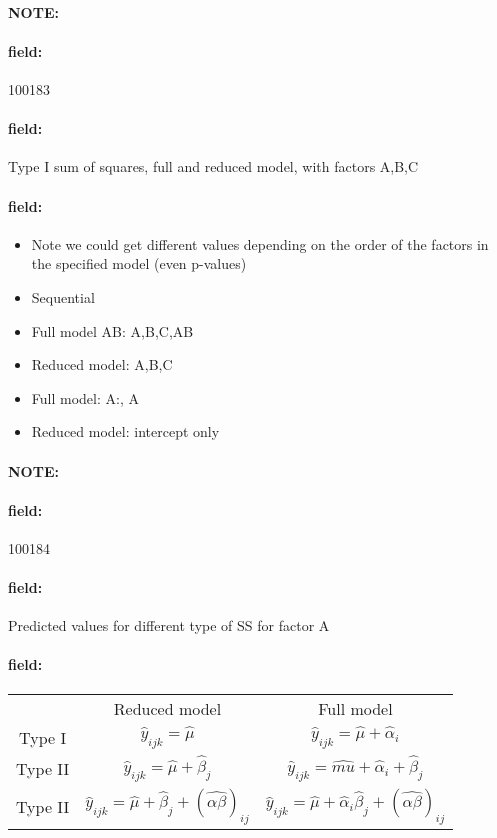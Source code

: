 \documentclass[12pt]{article}
\newenvironment{note}{\paragraph{NOTE:}}{}
\newenvironment{field}{\paragraph{field:}}{}
\begin{document}
\begin{note}
    \begin{field}
        \tiny 100183
    \end{field}
    \begin{field}
        Type I sum of squares, full and reduced model, with factors A,B,C
    \end{field}
    \begin{field}
        \begin{itemize}
          \item Note we could get different values depending on the order of the factors in the specified model (even p-values)
          \item Sequential
          \item Full model AB: A,B,C,AB
          \item Reduced model: A,B,C
          \item Full model: A:, A
          \item Reduced model: intercept only
        \end{itemize}
    \end{field}
\end{note}

\begin{note}
    \begin{field}
        \tiny 100184
    \end{field}
    \begin{field}
        Predicted values for different type of SS for factor A
    \end{field}
    \begin{field}
        \begin{tabular}{c c c }
          & Reduced model & Full model \\
          Type I & $\hat{y}_{ijk} = \hat{\mu}$ & $\hat{y}_{ijk} = \hat{\mu} +\hat{\alpha}_i$\\
          Type II & $\hat{y}_{ijk} = \hat{\mu} + \hat{\beta}_j$ & $\hat{y}_{ijk} = \hat{mu} + \hat{\alpha}_i + \hat{\beta}_j$\\
          Type II & $\hat{y}_{ijk} = \hat{\mu} + \hat{\beta}_j + (\hat{\alpha\beta})_{ij}$ &  $\hat{y}_{ijk} = \hat{\mu} + \hat{\alpha}_i \hat{\beta}_j + (\hat{\alpha\beta})_{ij}$
        \end{tabular}
    \end{field}
\end{note}
\end{document}
